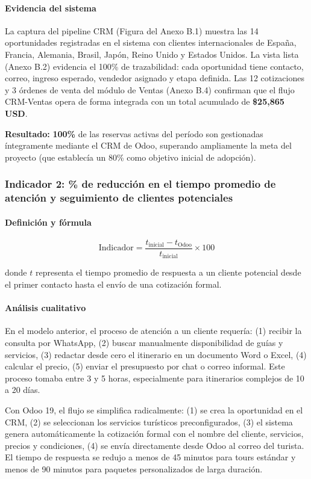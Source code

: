 \paragraph{Evidencia del sistema}
La captura del pipeline CRM (Figura del Anexo B.1) muestra las 14 oportunidades registradas en el sistema con clientes internacionales de España, Francia, Alemania, Brasil, Japón, Reino Unido y Estados Unidos. La vista lista (Anexo B.2) evidencia el 100\% de trazabilidad: cada oportunidad tiene contacto, correo, ingreso esperado, vendedor asignado y etapa definida. Las 12 cotizaciones y 3 órdenes de venta del módulo de Ventas (Anexo B.4) confirman que el flujo CRM-Ventas opera de forma integrada con un total acumulado de \textbf{\$25,865 USD}.

\textbf{Resultado:} \textbf{100\%} de las reservas activas del período son gestionadas íntegramente mediante el CRM de Odoo, superando ampliamente la meta del proyecto (que establecía un 80\% como objetivo inicial de adopción).

\subsubsection{Indicador 2: \% de reducción en el tiempo promedio de atención y seguimiento de clientes potenciales}

\paragraph{Definición y fórmula}
\[
\text{Indicador} = \frac{t_{\text{inicial}} - t_{\text{Odoo}}}{t_{\text{inicial}}} \times 100
\]

donde $t$ representa el tiempo promedio de respuesta a un cliente potencial desde el primer contacto hasta el envío de una cotización formal.

\paragraph{Análisis cualitativo}
En el modelo anterior, el proceso de atención a un cliente requería: (1) recibir la consulta por WhatsApp, (2) buscar manualmente disponibilidad de guías y servicios, (3) redactar desde cero el itinerario en un documento Word o Excel, (4) calcular el precio, (5) enviar el presupuesto por chat o correo informal. Este proceso tomaba entre 3 y 5 horas, especialmente para itinerarios complejos de 10 a 20 días.

Con Odoo 19, el flujo se simplifica radicalmente: (1) se crea la oportunidad en el CRM, (2) se seleccionan los servicios turísticos preconfigurados, (3) el sistema genera automáticamente la cotización formal con el nombre del cliente, servicios, precios y condiciones, (4) se envía directamente desde Odoo al correo del turista. El tiempo de respuesta se redujo a menos de 45 minutos para tours estándar y menos de 90 minutos para paquetes personalizados de larga duración.

